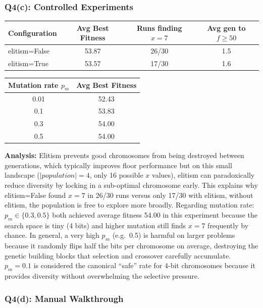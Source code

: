 \documentclass[12pt,a4paper]{article}
\begin{document}
\subsubsection*{Q4(c): Controlled Experiments}

\begin{center}
\begin{tabular}{lccc}
\toprule
Configuration & Avg Best Fitness & Runs finding $x=7$ & Avg gen to $f \geq 50$ \\
\midrule
elitism=False & 53.87 & 26/30 & 1.5 \\
elitism=True  & 53.57 & 17/30 & 1.6 \\
\bottomrule
\end{tabular}
\end{center}

\begin{center}
\begin{tabular}{cc}
\toprule
Mutation rate $p_m$ & Avg Best Fitness \\
\midrule
0.01 & 52.43 \\
0.1  & 53.83 \\
0.3  & 54.00 \\
0.5  & 54.00 \\
\bottomrule
\end{tabular}
\end{center}

\textbf{Analysis:}
Elitism prevents good chromosomes from being destroyed between generations,
which typically improves floor performance but on this small landscape
($|population|=4$, only 16 possible $x$ values), elitism can paradoxically
reduce diversity by locking in a sub-optimal chromosome early.
This explains why elitism=False found $x=7$ in 26/30 runs versus only 17/30
with elitism, without elitism, the population is free to explore more broadly.
Regarding mutation rate: $p_m \in \{0.3, 0.5\}$ both achieved average fitness
54.00 in this experiment because the search space is tiny (4 bits) and higher
mutation still finds $x=7$ frequently by chance.
In general, a very high $p_m$ (e.g.\ 0.5) is harmful on larger problems because
it randomly flips half the bits per chromosome on average, destroying the genetic
building blocks that selection and crossover carefully accumulate.
$p_m = 0.1$ is considered the canonical ``safe'' rate for 4-bit chromosomes
because it provides diversity without overwhelming the selective pressure.

\subsubsection*{Q4(d): Manual Walkthrough}
\end{document}
